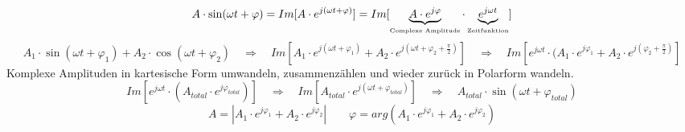 $$A \cdot \sin(\omega t + \varphi) = Im[A \cdot e^{j(\omega t + \varphi)}] =
Im[\underbrace{A \cdot e^{j\varphi}}_{\text{\tiny{Complexe Amplitude}}}
\cdot \underbrace{e^{j\omega t}}_{\text{\tiny{Zeitfunktion}}}]$$
%
%
$$ A_1 \cdot \sin(\omega t + \varphi_1) + A_2 \cdot \cos(\omega t + \varphi_2) 
 \quad \Rightarrow \quad 
 Im[A_1 \cdot e^{j(\omega t + \varphi_1)} + A_2 \cdot e^{j (\omega t + \varphi_2
 + \frac{\pi}{2})}] \quad \Rightarrow \quad 
 Im[e^{j \omega t} \cdot  (A_1 \cdot e^{j \varphi_1} + A_2 \cdot e^{j (\varphi_2
 + \frac{\pi}{2})}]$$ 
Komplexe Amplituden in kartesische Form umwandeln, zusammenzählen und wieder
zurück in Polarform wandeln.
$$ Im[e^{j \omega t} \cdot  (A_{total} \cdot e^{j \varphi_{total}})] 
 \quad \Rightarrow \quad 
 Im[A_{total} \cdot e^{j (\omega t + \varphi_{total})}] 
 \quad \Rightarrow \quad 
 A_{total} \cdot \sin(\omega t + \varphi_{total})$$ 
$$A = |A_1 \cdot e^{j\varphi_1} + A_2 \cdot e^{j\varphi_2}| \qquad \varphi = arg(A_1 \cdot e^{j\varphi_1} + A_2 \cdot e^{j\varphi_2})$$
